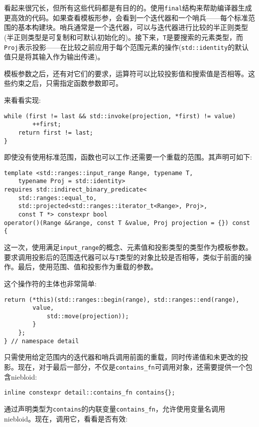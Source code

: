 看起来很冗长，但所有这些代码都是有目的的。使用\texttt{final}结构来帮助编译器生成更高效的代码。如果查看模板形参，会看到一个迭代器和一个哨兵——每个标准范围的基本构建块。哨兵通常是一个迭代器，可以与迭代器进行比较的半正则类型(半正则类型是可复制和可默认初始化的)。接下来，\texttt{T}是要搜索的元素类型，而\texttt{Proj}表示投影——在比较之前应用于每个范围元素的操作(\texttt{std::identity}的默认值只是将其输入作为输出传递)。

模板参数之后，还有对它们的要求，运算符可以比较投影值和搜索值是否相等。这些约束之后，只需指定函数参数即可。

来看看实现:

\begin{lstlisting}[style=styleCXX]
	while (first != last && std::invoke(projection, *first) != value)
		++first;
	return first != last;
}
\end{lstlisting}

即使没有使用标准范围，函数也可以工作;还需要一个重载的范围。其声明可如下:

\begin{lstlisting}[style=styleCXX]
template <std::ranges::input_range Range, typename T,
	typename Proj = std::identity>
requires std::indirect_binary_predicate<
	std::ranges::equal_to,
	std::projected<std::ranges::iterator_t<Range>, Proj>,
	const T *> constexpr bool
operator()(Range &&range, const T &value, Proj projection = {}) const {
\end{lstlisting}

这一次，使用满足\texttt{input\_range}的概念、元素值和投影类型的类型作为模板参数。要求调用投影后的范围迭代器可以与\texttt{T}类型的对象比较是否相等，类似于前面的操作。最后，使用范围、值和投影作为重载的参数。

这个操作符的主体也非常简单:

\begin{lstlisting}[style=styleCXX]
		return (*this)(std::ranges::begin(range), std::ranges::end(range),
		value,
			std::move(projection));
		}
	};
} // namespace detail
\end{lstlisting}

只需使用给定范围内的迭代器和哨兵调用前面的重载，同时传递值和未更改的投影。现在，对于最后一部分，不仅是\texttt{contains\_fn}可调用对象，还需要提供一个包含niebloid:

\begin{lstlisting}[style=styleCXX]
inline constexpr detail::contains_fn contains{};
\end{lstlisting}

通过声明类型为\texttt{contains}的内联变量\texttt{contains\_fn}，允许使用变量名调用niebloid。现在，调用它，看看是否有效:

